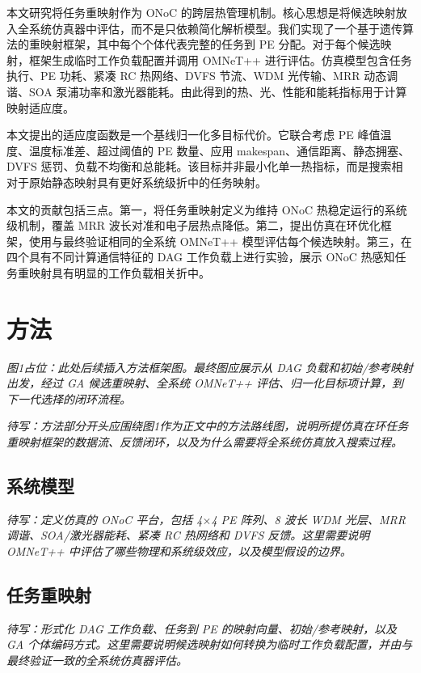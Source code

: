 \documentclass[conference]{IEEEtran}
\begin{document}
本文研究将任务重映射作为 ONoC 的跨层热管理机制。核心思想是将候选映射放入全系统仿真器中评估，而不是只依赖简化解析模型。我们实现了一个基于遗传算法的重映射框架，其中每个个体代表完整的任务到 PE 分配。对于每个候选映射，框架生成临时工作负载配置并调用 OMNeT++ 进行评估。仿真模型包含任务执行、PE 功耗、紧凑 RC 热网络、DVFS 节流、WDM 光传输、MRR 动态调谐、SOA 泵浦功率和激光器能耗。由此得到的热、光、性能和能耗指标用于计算映射适应度。

本文提出的适应度函数是一个基线归一化多目标代价。它联合考虑 PE 峰值温度、温度标准差、超过阈值的 PE 数量、应用 makespan、通信距离、静态拥塞、DVFS 惩罚、负载不均衡和总能耗。该目标并非最小化单一热指标，而是搜索相对于原始静态映射具有更好系统级折中的任务映射。

本文的贡献包括三点。第一，将任务重映射定义为维持 ONoC 热稳定运行的系统级机制，覆盖 MRR 波长对准和电子层热点降低。第二，提出仿真在环优化框架，使用与最终验证相同的全系统 OMNeT++ 模型评估每个候选映射。第三，在四个具有不同计算通信特征的 DAG 工作负载上进行实验，展示 ONoC 热感知任务重映射具有明显的工作负载相关折中。

\section{方法}

\noindent\textit{图1占位：此处后续插入方法框架图。最终图应展示从 DAG 负载和初始/参考映射出发，经过 GA 候选重映射、全系统 OMNeT++ 评估、归一化目标项计算，到下一代选择的闭环流程。}

\noindent\textit{待写：方法部分开头应围绕图1作为正文中的方法路线图，说明所提仿真在环任务重映射框架的数据流、反馈闭环，以及为什么需要将全系统仿真放入搜索过程。}

\subsection{系统模型}

\noindent\textit{待写：定义仿真的 ONoC 平台，包括 4$\times$4 PE 阵列、8 波长 WDM 光层、MRR 调谐、SOA/激光器能耗、紧凑 RC 热网络和 DVFS 反馈。这里需要说明 OMNeT++ 中评估了哪些物理和系统级效应，以及模型假设的边界。}

\subsection{任务重映射}

\noindent\textit{待写：形式化 DAG 工作负载、任务到 PE 的映射向量、初始/参考映射，以及 GA 个体编码方式。这里需要说明候选映射如何转换为临时工作负载配置，并由与最终验证一致的全系统仿真器评估。}
\end{document}

